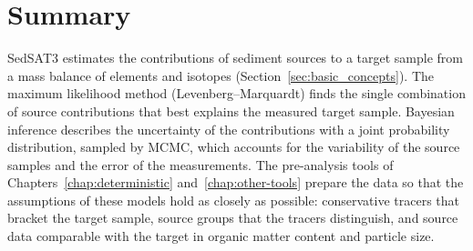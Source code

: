 \section{Summary}
SedSAT3 estimates the contributions of sediment sources to a target sample from a mass balance of elements and isotopes (Section~\ref{sec:basic_concepts}). The maximum likelihood method (Levenberg--Marquardt) finds the single combination of source contributions that best explains the measured target sample. Bayesian inference describes the uncertainty of the contributions with a joint probability distribution, sampled by MCMC, which accounts for the variability of the source samples and the error of the measurements. The pre-analysis tools of Chapters~\ref{chap:deterministic} and~\ref{chap:other-tools} prepare the data so that the assumptions of these models hold as closely as possible: conservative tracers that bracket the target sample, source groups that the tracers distinguish, and source data comparable with the target in organic matter content and particle size.

